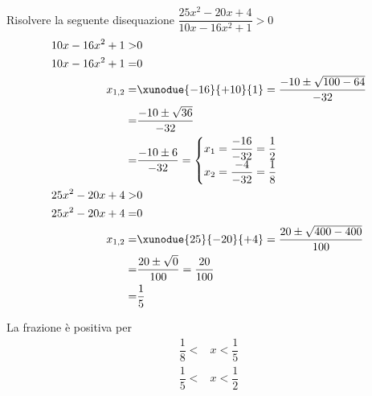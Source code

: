 	Risolvere la seguente disequazione $\dfrac{25x^2-20x+4}{10x-16x^2+1}> 0$
\begin{align*}
10x-16x^2+1>&0\\
10x-16x^2+1=&0\\
x_{1,2}=&\xunodue{-16}{+10}{1}=\dfrac{-10\pm\sqrt{100-64}}{-32}\\
=&\dfrac{-10\pm\sqrt{36}}{-32}\\
=&\dfrac{-10\pm 6}{-32}=\begin{cases}
x_1=\dfrac{-16}{-32}=\dfrac{1}{2}\\
x_2=\dfrac{-4}{-32}=\dfrac{1}{8}
\end{cases}\\
25x^2-20x+4>&0\\
25x^2-20x+4=&0\\
x_{1,2}=&\xunodue{25}{-20}{+4}=\dfrac{20\pm\sqrt{400-400}}{100}\\
=&\dfrac{20\pm\sqrt{0}}{100}=\dfrac{20}{100}\\
=&\dfrac{1}{5}\\
\end{align*}
	\begin{center}
	
\end{center}
La frazione è positiva per
\begin{align*}
\dfrac{1}{8}<&x<\dfrac{1}{5}\\ \dfrac{1}{5}<&x<\dfrac{1}{2}\\
\end{align*}
